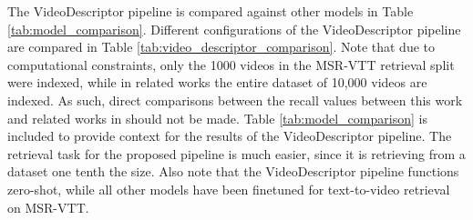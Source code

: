 \documentclass{article}
\begin{document}
The VideoDescriptor pipeline is compared against other models in Table \ref{tab:model_comparison}.
Different configurations of the VideoDescriptor pipeline are compared in Table \ref{tab:video_descriptor_comparison}. %
Note that due to computational constraints, only the 1000 videos in the MSR-VTT retrieval split were indexed, while in related works the entire dataset of 10,000 videos are indexed.
As such, direct comparisons between the recall values between this work and related works in should not be made.
Table \ref{tab:model_comparison} is included to provide context for the results of the VideoDescriptor pipeline.
The retrieval task for the proposed pipeline is much easier, since it is retrieving from a dataset one tenth the size.
Also note that the VideoDescriptor pipeline functions zero-shot, while all other models have been finetuned for text-to-video retrieval on MSR-VTT.
\end{document}
